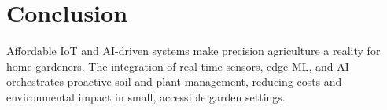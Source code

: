 \documentclass{sigchi}
\begin{document}
\section{Conclusion}

Affordable IoT and AI-driven systems make precision agriculture a reality for home gardeners. The integration of real-time sensors, edge ML, and AI orchestrates proactive soil and plant management, reducing costs and environmental impact in small, accessible garden settings.

\balance{}




\end{document}
